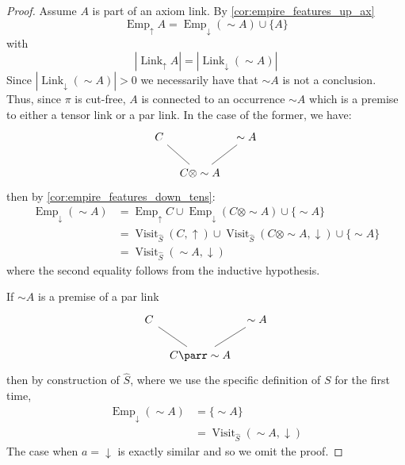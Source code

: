\documentclass[12pt]{article}
\theoremstyle{plain}
\theoremstyle{definition}
\newcommand{\negation}{\sim}
\begin{document}
\begin{proof}
		Assume $A$ is part of an axiom link. By \eqref{cor:empire_features_up_ax}
		\begin{equation}
			\operatorname{Emp}_{\uparrow}A = \operatorname{Emp}_{\downarrow}(\negation A) \cup \lbrace A \rbrace
		\end{equation}
		with
		\begin{equation}
			|\operatorname{Link}_{\uparrow}A| = |\operatorname{Link}_{\downarrow}(\negation A)|
		\end{equation}
		Since $|\operatorname{Link}_{\downarrow}(\negation A)| > 0$ we necessarily have that $\negation A$ is not a conclusion. Thus, since $\pi$ is cut-free, $A$ is connected to an occurrence $\negation A$ which is a premise to either a tensor link or a par link. In the case of the former, we have:
		\[
		\begin{tikzcd}[column sep = tiny]
			C\arrow[dr,dash] && \negation A\arrow[dl,dash]\\
			& C \otimes \negation A
		\end{tikzcd}
		\]
		then by \eqref{cor:empire_features_down_tens}:
		\begin{align*}
			\operatorname{Emp}_{\downarrow}(\negation A) &= \operatorname{Emp}_{\uparrow}C \cup \operatorname{Emp}_{\downarrow}(C \otimes \negation A) \cup \lbrace \negation A\rbrace\\
			&= \operatorname{Visit}_{\hat{S}}(C,\uparrow) \cup \operatorname{Visit}_{\hat{S}}(C \otimes \negation A,\downarrow) \cup \lbrace \negation A\rbrace\\
			&= \operatorname{Visit}_{\hat{S}}(\negation A, \downarrow)
		\end{align*}
		where the second equality follows from the inductive hypothesis.
		
		If $\negation A$ is a premise of a par link
		\[
		\begin{tikzcd}[column sep = tiny]
			C\arrow[dr,dash] && \negation A\arrow[dl,dash]\\
			& C \parr \negation A
		\end{tikzcd}
		\]
		then by construction of $\hat{S}$, where we use the specific definition of $S$ for the first time,
		\begin{align*}
			\operatorname{Emp}_{\downarrow}(\negation A) &= \lbrace \negation A\rbrace\\
			&= \operatorname{Visit}_{\hat{S}}(\negation A,\downarrow)
		\end{align*}
		The case when $a = \downarrow$ is exactly similar and so we omit the proof.
	\end{proof}
\end{document}
